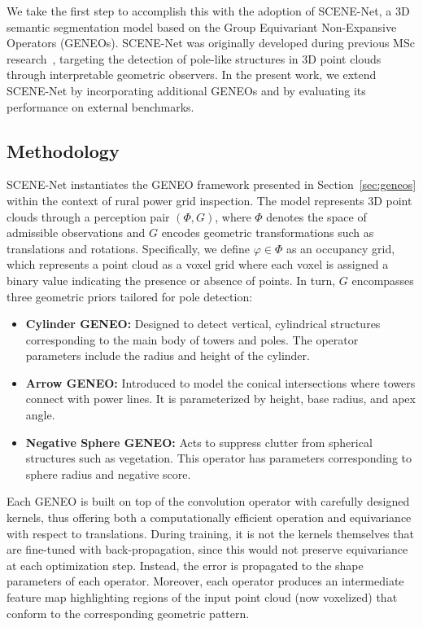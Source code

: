 We take the first step to accomplish this with the adoption of SCENE-Net, a 3D
semantic segmentation model based on the Group Equivariant Non-Expansive
Operators (GENEOs).
%
SCENE-Net was originally developed during previous MSc
research~\cite{lavado2022detection}, targeting the detection of pole-like
structures in 3D point clouds through interpretable geometric observers. In the
present work, we extend SCENE-Net by incorporating additional GENEOs and by
evaluating its performance on external benchmarks.

\subsection{Methodology}

SCENE-Net instantiates the GENEO framework presented in
Section~\ref{sec:geneos} within the context of rural power grid inspection. The
model represents 3D point clouds through a perception pair $(\Phi, G)$, where
$\Phi$ denotes the space of admissible observations and $G$ encodes geometric
transformations such as translations and rotations.
%
Specifically, we define $\varphi \in \Phi$ as an occupancy grid, which
represents a point cloud as a voxel grid where each voxel is assigned a binary
value indicating the presence or absence of points.
%
In turn, $G$ encompasses three geometric priors tailored for pole detection:
\begin{itemize}
      \item \textbf{Cylinder GENEO:}
            Designed to detect vertical, cylindrical structures corresponding
            to the main body of towers and poles. The operator parameters include
            the radius and height of the cylinder.
      \item \textbf{Arrow GENEO:}
            Introduced to model the conical intersections where towers connect
            with power lines. It is parameterized by height, base radius,
            and apex angle.
      \item \textbf{Negative Sphere GENEO:}
            Acts to suppress clutter from spherical structures such as vegetation.
            This operator has parameters corresponding to sphere radius and
            negative score.
\end{itemize}

Each GENEO is built on top of the convolution operator with carefully designed
kernels, thus offering both a computationally efficient operation and
equivariance with respect to translations.
%
During training, it is not the kernels themselves that are fine-tuned with
back-propagation, since this would not preserve equivariance at each
optimization step. Instead, the error is propagated to the shape parameters of
each operator.
%
Moreover, each operator produces an intermediate feature map highlighting
regions of the input point cloud (now voxelized) that conform to the
corresponding geometric pattern.

